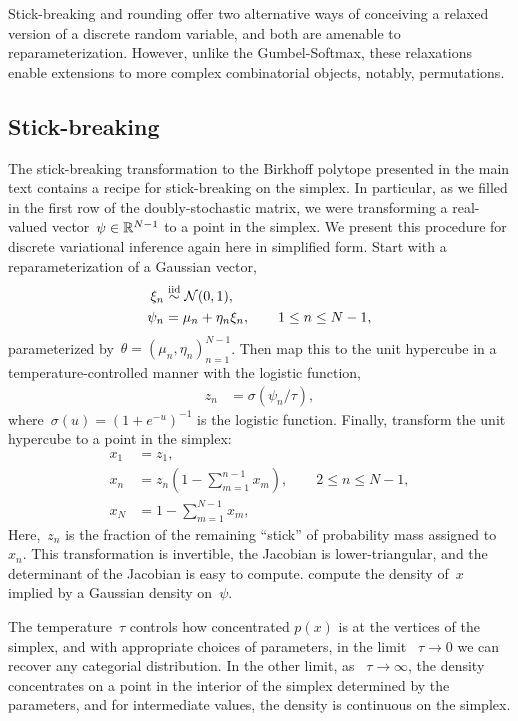 Stick-breaking and rounding offer two alternative ways of conceiving a
relaxed version of a discrete random variable, and both are amenable
to reparameterization. However, unlike the Gumbel-Softmax, these
relaxations enable extensions to more complex combinatorial objects,
notably, permutations.

\subsection{Stick-breaking}

The stick-breaking transformation to the Birkhoff polytope presented
in the main text contains a recipe for stick-breaking on the simplex.
In particular, as we filled in the first row of the doubly-stochastic
matrix, we were transforming a real-valued vector~$\psi \in \mathbb{R}^{N-1}$
to a point in the simplex.  We present this procedure for
discrete variational inference again here in simplified form.
Start with a reparameterization of a Gaussian vector,
\begin{align*}
  \xi_n &\stackrel{\text{iid}}{\sim} \mathcal{N}(0, 1), \\
  \psi_n & = \mu_n + \eta_n \xi_n, \qquad 1 \leq n \leq N-1,
\end{align*}
parameterized by~${\theta = (\mu_n, \eta_n)_{n=1}^{N-1}}$. 
Then map this to the unit hypercube in a temperature-controlled manner
with the logistic function,
\begin{align*}
  z_n &= \sigma(\psi_n / \tau),
\end{align*}
where~${\sigma(u) = (1+e^{-u})^{-1}}$ is the logistic function.
Finally, transform the unit hypercube to a point in the simplex:
\begin{align*}
  x_1 &= z_1, \\
  x_n &= z_n \left(1- \sum_{m=1}^{n-1} x_m\right), \qquad 2 \leq n \leq N-1,  \\
  x_N &= 1- \sum_{m=1}^{N-1} x_m,
\end{align*}
Here,~$z_n$ is the fraction of the remaining ``stick'' of probability
mass assigned to~$x_n$.  This transformation is invertible, the
Jacobian is lower-triangular, and the determinant of the Jacobian is
easy to compute.  \citet{linderman2015dependent} compute the density
of~$x$ implied by a Gaussian density on~$\psi$.

The temperature~$\tau$ controls how concentrated $p(x)$ is at the
vertices of the simplex, and with appropriate choices of parameters,
in the limit ~$\tau \to 0$ we can recover any categorial
distribution. In the other limit, as ~$\tau \to \infty$, the density
concentrates on a point in the interior of the simplex determined by
the parameters, and for intermediate values, the density is continuous
on the simplex.

